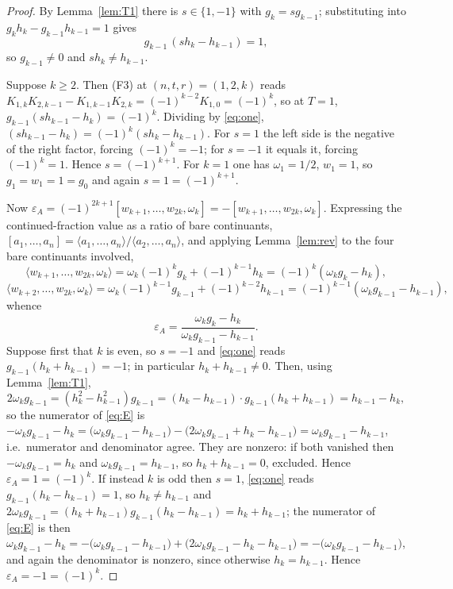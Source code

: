 \documentclass[11pt]{amsart}
\theoremstyle{remark}
\newcommand{\Kc}[2]{K_{#1,#2}}
\begin{document}
\begin{proof}
By Lemma~\ref{lem:T1} there is $s\in\{1,-1\}$ with $g_k=sg_{k-1}$; substituting into
$g_kh_k-g_{k-1}h_{k-1}=1$ gives
\begin{equation}\label{eq:one}
 g_{k-1}\,(sh_k-h_{k-1})=1,
\end{equation}
so $g_{k-1}\ne0$ and $sh_k\ne h_{k-1}$.

Suppose $k\ge2$. Then (F3) at $(n,t,r)=(1,2,k)$ reads
$\Kc1k\Kc2{k-1}-\Kc1{k-1}\Kc2k=(-1)^{k-2}\Kc1{0}=(-1)^k$, so at $T=1$,
$g_{k-1}(sh_{k-1}-h_k)=(-1)^k$. Dividing by \eqref{eq:one},
$(sh_{k-1}-h_k)=(-1)^k(sh_k-h_{k-1})$. For $s=1$ the left side is the negative of the right factor,
forcing $(-1)^k=-1$; for $s=-1$ it equals it, forcing $(-1)^k=1$. Hence $s=(-1)^{k+1}$. For $k=1$
one has $\omega_1=1/2$, $w_1=1$, so $g_1=w_1=1=g_0$ and again $s=1=(-1)^{k+1}$.

Now $\varepsilon_A=(-1)^{2k+1}[w_{k+1},\dots,w_{2k},\omega_k]=-[w_{k+1},\dots,w_{2k},\omega_k]$.
Expressing the continued-fraction value as a ratio of bare continuants,
$[a_1,\dots,a_n]=\langle a_1,\dots,a_n\rangle/\langle a_2,\dots,a_n\rangle$, and applying
Lemma~\ref{lem:rev} to the four bare continuants involved,
\[
 \langle w_{k+1},\dots,w_{2k},\omega_k\rangle
 =\omega_k(-1)^kg_k+(-1)^{k-1}h_k=(-1)^k(\omega_kg_k-h_k),
\]
\[
 \langle w_{k+2},\dots,w_{2k},\omega_k\rangle
 =\omega_k(-1)^{k-1}g_{k-1}+(-1)^{k-2}h_{k-1}=(-1)^{k-1}(\omega_kg_{k-1}-h_{k-1}),
\]
whence
\begin{equation}\label{eq:E}
 \varepsilon_A=\frac{\omega_kg_k-h_k}{\omega_kg_{k-1}-h_{k-1}}.
\end{equation}
Suppose first that $k$ is even, so $s=-1$ and \eqref{eq:one} reads $g_{k-1}(h_k+h_{k-1})=-1$; in
particular $h_k+h_{k-1}\ne0$. Then, using Lemma~\ref{lem:T1},
\[
 2\omega_kg_{k-1}=(h_k^2-h_{k-1}^2)g_{k-1}=(h_k-h_{k-1})\cdot g_{k-1}(h_k+h_{k-1})=h_{k-1}-h_k,
\]
so the numerator of \eqref{eq:E} is
$-\omega_kg_{k-1}-h_k=\bigl(\omega_kg_{k-1}-h_{k-1}\bigr)-\bigl(2\omega_kg_{k-1}+h_k-h_{k-1}\bigr)
=\omega_kg_{k-1}-h_{k-1}$, i.e.\ numerator and denominator agree. They are nonzero: if both
vanished then $-\omega_kg_{k-1}=h_k$ and $\omega_kg_{k-1}=h_{k-1}$, so $h_k+h_{k-1}=0$, excluded.
Hence $\varepsilon_A=1=(-1)^k$. If instead $k$ is odd then $s=1$, \eqref{eq:one} reads
$g_{k-1}(h_k-h_{k-1})=1$, so $h_k\ne h_{k-1}$ and
$2\omega_kg_{k-1}=(h_k+h_{k-1})g_{k-1}(h_k-h_{k-1})=h_k+h_{k-1}$; the numerator of \eqref{eq:E} is
then $\omega_kg_{k-1}-h_k=-\bigl(\omega_kg_{k-1}-h_{k-1}\bigr)+
\bigl(2\omega_kg_{k-1}-h_k-h_{k-1}\bigr)=-\bigl(\omega_kg_{k-1}-h_{k-1}\bigr)$, and again the
denominator is nonzero, since otherwise $h_k=h_{k-1}$. Hence $\varepsilon_A=-1=(-1)^k$.
\end{proof}
\end{document}
